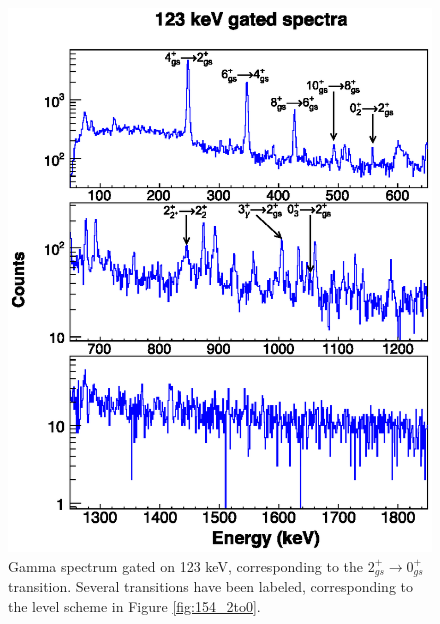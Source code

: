 \begin{figure}
    \includegraphics[scale=1.3]{154GdTablesAndFigs/123_gamma.eps}
    \caption{Gamma spectrum gated on 123 keV, corresponding to the $2_{gs}^+\rightarrow 0_{gs}^+$ transition. Several transitions have been labeled, corresponding to the level scheme in Figure \ref{fig:154_2to0}.}
    \label{fig:154_2to0spec}
\end{figure}